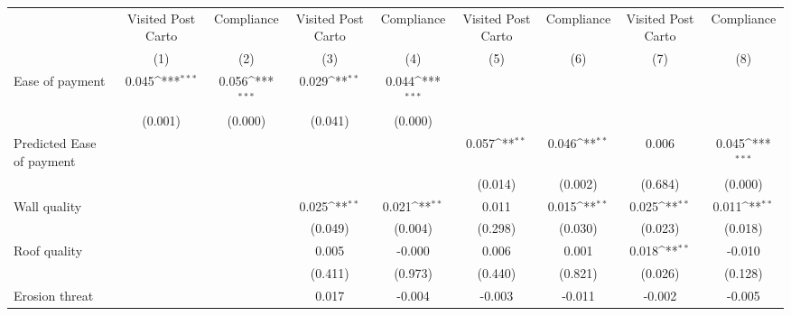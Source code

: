 {
\def\sym#1{\ifmmode^{#1}\else\(^{#1}\)\fi}
\begin{tabular}{l*{8}{c}}
\toprule
                &\multicolumn{1}{c}{Visited Post Carto}&\multicolumn{1}{c}{Compliance}&\multicolumn{1}{c}{Visited Post Carto}&\multicolumn{1}{c}{Compliance}&\multicolumn{1}{c}{Visited Post Carto}&\multicolumn{1}{c}{Compliance}&\multicolumn{1}{c}{Visited Post Carto}&\multicolumn{1}{c}{Compliance}\\
                &\multicolumn{1}{c}{(1)}         &\multicolumn{1}{c}{(2)}         &\multicolumn{1}{c}{(3)}         &\multicolumn{1}{c}{(4)}         &\multicolumn{1}{c}{(5)}         &\multicolumn{1}{c}{(6)}         &\multicolumn{1}{c}{(7)}         &\multicolumn{1}{c}{(8)}         \\
\midrule
Ease of payment &    0.045\sym{***}&    0.056\sym{***}&    0.029\sym{**} &    0.044\sym{***}&                  &                  &                  &                  \\
                &  (0.001)         &  (0.000)         &  (0.041)         &  (0.000)         &                  &                  &                  &                  \\
Predicted Ease of payment&                  &                  &                  &                  &    0.057\sym{**} &    0.046\sym{**} &    0.006         &    0.045\sym{***}\\
                &                  &                  &                  &                  &  (0.014)         &  (0.002)         &  (0.684)         &  (0.000)         \\
Wall quality    &                  &                  &    0.025\sym{**} &    0.021\sym{**} &    0.011         &    0.015\sym{**} &    0.025\sym{**} &    0.011\sym{**} \\
                &                  &                  &  (0.049)         &  (0.004)         &  (0.298)         &  (0.030)         &  (0.023)         &  (0.018)         \\
Roof quality    &                  &                  &    0.005         &   -0.000         &    0.006         &    0.001         &    0.018\sym{**} &   -0.010         \\
                &                  &                  &  (0.411)         &  (0.973)         &  (0.440)         &  (0.821)         &  (0.026)         &  (0.128)         \\
Erosion threat  &                  &                  &    0.017         &   -0.004         &   -0.003         &   -0.011         &   -0.002         &   -0.005         \\

\end{tabular}}
